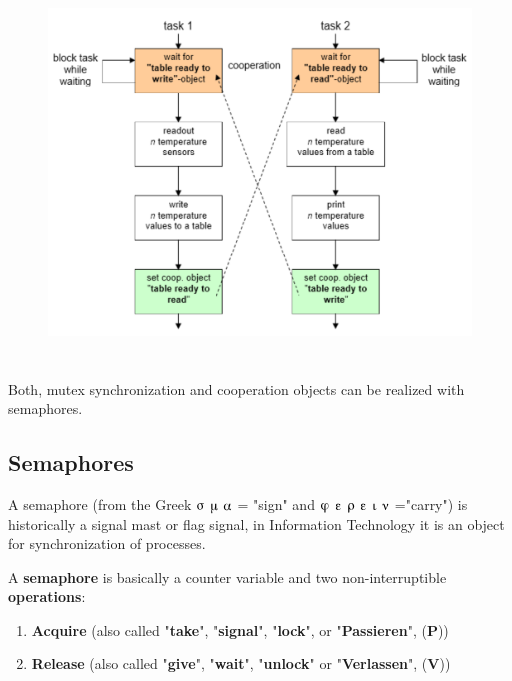 \begin{enumerate}
 	\begin{figure}[h]
    \centering
    \includegraphics[width=14cm, height=10cm]{Images/image104.png}
    \label{fig:Fig }
    \end{figure}
    
Both, mutex synchronization and cooperation objects can be realized with semaphores.\\
\end{enumerate}

\subsection{Semaphores}

A semaphore (from the Greek $\sigmaup$ $\muup$ $\alphaup$ = "sign" and $\varphiup$ $\varepsilonup$ $\rhoup$ $\varepsilonup$ $\iotaup$ $\nuup$ ="carry") is historically a signal mast or flag signal, in Information Technology it is an object for synchronization of processes.


A \textbf{semaphore} is basically a counter variable and two non-interruptible \textbf{operations}:  

\begin{enumerate}
\item  \textbf{Acquire}   (also called "\textbf{take}", "\textbf{signal}",  "\textbf{lock}",     or "\textbf{Passieren}", (\textbf{P}))
\item  \textbf{Release}  (also called "\textbf{give}", "\textbf{wait}",  "\textbf{unlock}"  or "\textbf{Verlassen}", (\textbf{V}))
\end{enumerate}

